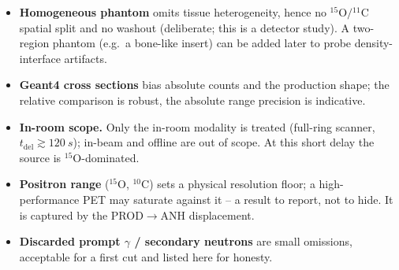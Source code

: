 \documentclass[11pt]{article}
\newcommand{\Cl}[1]{{}^{#1}\mathrm{C}}
\newcommand{\Ox}[1]{{}^{#1}\mathrm{O}}
\begin{document}
\begin{itemize}[nosep]
\item \textbf{Homogeneous phantom} omits tissue heterogeneity, hence no
$\Ox{15}/\Cl{11}$ spatial split and no washout (deliberate; this is a detector
study). A two-region phantom (e.g.\ a bone-like insert) can be added later to
probe density-interface artifacts.
\item \textbf{Geant4 cross sections} bias absolute counts and the production
shape; the relative comparison is robust, the absolute range precision is
indicative.
\item \textbf{In-room scope.} Only the in-room modality is treated (full-ring
scanner, $t_{\mathrm{del}}\gtrsim\SI{120}{s}$); in-beam and offline are out of
scope. At this short delay the source is $\Ox{15}$-dominated.
\item \textbf{Positron range} ($\Ox{15}$, $\Cl{10}$) sets a physical resolution
floor; a high-performance PET may saturate against it -- a result to report, not
to hide. It is captured by the PROD$\to$ANH displacement.
\item \textbf{Discarded prompt $\gamma$ / secondary neutrons} are small omissions,
acceptable for a first cut and listed here for honesty.
\end{itemize}
\end{document}
